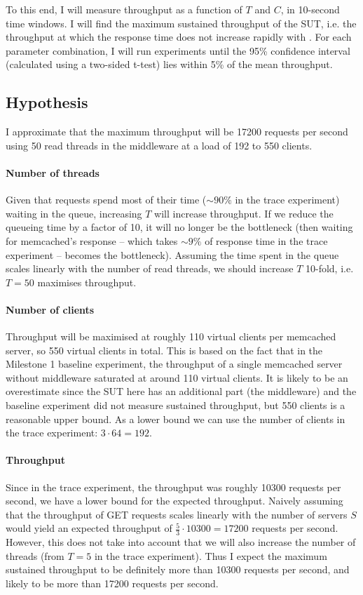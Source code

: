 \documentclass[11pt]{article}
\newcommand{\todo}[1]{\fcolorbox{black}{Apricot}{TODO: #1}}
\begin{document}
To this end, I will measure throughput as a function of $T$ and $C$, in 10-second time windows. I will find the maximum sustained throughput of the SUT, i.e. the throughput at which the response time does not increase rapidly with \todo{additional clients}. For each parameter combination, I will run experiments until the 95\% confidence interval (calculated using a two-sided t-test) lies within 5\% of the mean throughput.

\subsection{Hypothesis}

I approximate that the maximum throughput will be 17200 requests per second using 50 read threads in the middleware at a load of 192 to 550 clients.

\paragraph{Number of threads} 
Given that requests spend most of their time ($\sim90\%$ in the trace experiment) waiting in the queue, increasing $T$ will increase throughput. If we reduce the queueing time by a factor of 10, it will no longer be the bottleneck (then waiting for memcached's response -- which takes $\sim9\%$ of response time in the trace experiment -- becomes the bottleneck). Assuming the time spent in the queue scales linearly with the number of read threads, we should increase $T$ 10-fold, i.e. $T=50$ maximises throughput.

\paragraph{Number of clients}
Throughput will be maximised at roughly 110 virtual clients per memcached server, so 550 virtual clients in total. This is based on the fact that in the Milestone 1 baseline experiment, the throughput of a single memcached server without middleware saturated at around 110 virtual clients. It is likely to be an overestimate since the SUT here has an additional part (the middleware) and the baseline experiment did not measure sustained throughput, but 550 clients is a reasonable upper bound. As a lower bound we can use the number of clients in the trace experiment: $3 \cdot 64=192$.

\paragraph{Throughput}
Since in the trace experiment, the throughput was roughly 10300 requests per second, we have a lower bound for the expected throughput. Naively assuming that the throughput of GET requests scales linearly with the number of servers $S$ would yield an expected throughput of $\frac{5}{3} \cdot 10300 = 17200$ requests per second. However, this does not take into account that we will also increase the number of threads (from $T=5$ in the trace experiment). Thus I expect the maximum sustained throughput to be definitely more than 10300 requests per second, and likely to be more than 17200 requests per second.
\end{document}
